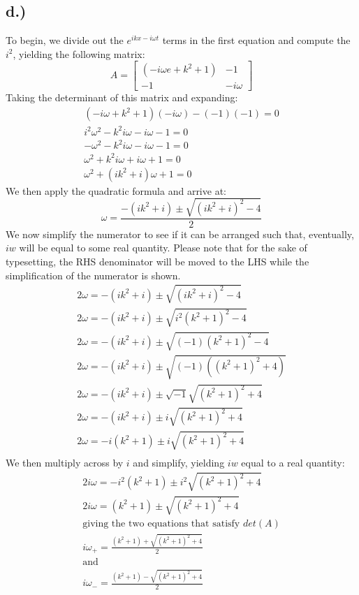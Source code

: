 \documentclass{article}
\begin{document}
\subsection*{d.)}
To begin, we divide out the $e^{ikx - i\omega t}$ terms in the first equation and compute the $i^2$, yielding the following matrix:
\[
A =
\begin{bmatrix}
(-i\omega e + k^2 + 1) & -1\\
-1 & -i\omega
\end{bmatrix}
\]
Taking the determinant of this matrix and expanding:
\begin{equation}
\begin{aligned}
(-i\omega + k^2 + 1)(-i\omega) - (-1)(-1) = 0\\
i^2\omega^2 - k^2i\omega - i\omega -1 = 0\\
-\omega^2 - k^2i\omega -i\omega -1 = 0\\
\omega^2 + k^2i\omega + i\omega + 1 = 0\\
\omega^2 + (ik^2 + i)\omega + 1 =0
\end{aligned}
\end{equation}
We then apply the quadratic formula and arrive at:
\begin{equation}
\omega = \frac{-(ik^2 + i) \pm \sqrt{(ik^2 + i)^2 -4}}{2}
\end{equation}
We now simplify the numerator to see if it can be arranged such that, eventually, $iw$ will be equal to some real quantity. Please note that for the sake of typesetting, the RHS denominator will be moved to the LHS while the simplification of the numerator is shown.
\begin{equation}
\begin{aligned}
2\omega = -(ik^2 + i) \pm \sqrt{(ik^2 + i)^2 -4}\\
2\omega = -(ik^2 + i) \pm \sqrt{i^2(k^2 + 1)^2 -4}\\
2\omega = -(ik^2 + i) \pm \sqrt{(-1)(k^2 + 1)^2 -4}\\
2\omega = -(ik^2 + i) \pm \sqrt{(-1)((k^2 + 1)^2 +4)}\\
2\omega = -(ik^2 + i) \pm \sqrt{-1}\sqrt{(k^2 + 1)^2 +4}\\
2\omega = -(ik^2 + i) \pm i\sqrt{(k^2 + 1)^2 +4}\\
2\omega = -i(k^2 + 1) \pm i\sqrt{(k^2 + 1)^2 +4}\\
\end{aligned}
\end{equation}
We then multiply across by $i$ and simplify, yielding $iw$ equal to a real quantity:
\begin{equation}
\begin{aligned}
2i\omega = -i^2(k^2 + 1) \pm i^2\sqrt{(k^2 + 1)^2 +4}\\
2i\omega = (k^2 + 1) \pm \sqrt{(k^2 + 1)^2 +4}\\
\text{giving the two equations that satisfy $det(A)$}\\
i\omega_+ = \frac{(k^2 + 1) + \sqrt{(k^2 + 1)^2 +4}}{2}\\
\text{and}\\
i\omega_- = \frac{(k^2 + 1) - \sqrt{(k^2 + 1)^2 +4}}{2}\\
\end{aligned}
\end{equation}
\end{document}
